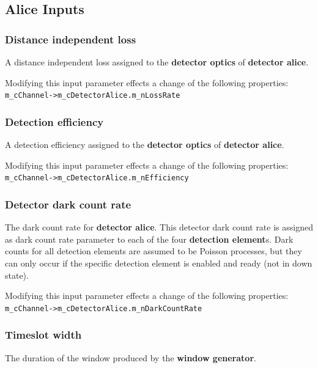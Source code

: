 \subsection{Alice Inputs}
\label{subsec:gui_alice}

\subsubsection{Distance independent loss}
A distance independent loss assigned to the \textbf{detector optics} of \textbf{detector alice}.

Modifying this input parameter effects a change of the following properties\hyperlink{fn:modinfo}{\footnotemark[\value{fnmodinfo}]}:\\
\texttt{m\_cChannel->m\_cDetectorAlice.m\_nLossRate}

\subsubsection{Detection efficiency}
A detection efficiency assigned to the \textbf{detector optics} of \textbf{detector alice}.

Modifying this input parameter effects a change of the following properties\hyperlink{fn:modinfo}{\footnotemark[\value{fnmodinfo}]}:\\
\texttt{m\_cChannel->m\_cDetectorAlice.m\_nEfficiency}

\subsubsection{Detector dark count rate}
The dark count rate for \textbf{detector alice}. This detector dark count rate is assigned as dark count rate parameter to each of the four \textbf{detection element}s. Dark counts for all detection elements are assumed to be Poisson processes, but they can only occur if the specific detection element is enabled and ready (not in down state).

Modifying this input parameter effects a change of the following properties\hyperlink{fn:modinfo}{\footnotemark[\value{fnmodinfo}]}:\\
\texttt{m\_cChannel->m\_cDetectorAlice.m\_nDarkCountRate}

\subsubsection{Timeslot width}
The duration of the window produced by the \textbf{window generator}.


